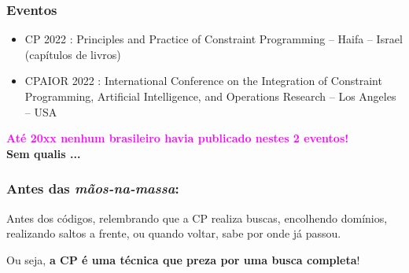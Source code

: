 \documentclass{beamer}
\begin{document}
\begin{frame}[fragile]

\frametitle{Eventos}

\begin{itemize}
    \item CP 2022 : Principles and Practice of Constraint Programming -- Haifa -- Israel (capítulos de livros)
    
    \item CPAIOR 2022 : International Conference on the Integration of Constraint Programming, Artificial Intelligence, and Operations Research -- Los Angeles -- USA
\end{itemize}

\begin{center}
\vfill
{\bf 
\textcolor{magenta}{Até 20xx nenhum brasileiro havia publicado nestes 2 eventos!}\\
Sem qualis ...
}
\end{center}

\end{frame}

\begin{frame}[fragile]

\frametitle{Antes das {\em mãos-na-massa}:}
\begin{center}
{\large 
    Antes dos códigos, relembrando  que a CP realiza buscas, encolhendo domínios, realizando saltos a frente, ou quando voltar, sabe por onde já passou. }
    
    \vspace{1cm}
    
{\large  Ou seja, {\bf a CP é uma técnica que preza por uma busca completa}!}
    
\end{center}


\end{frame}
\end{document}
